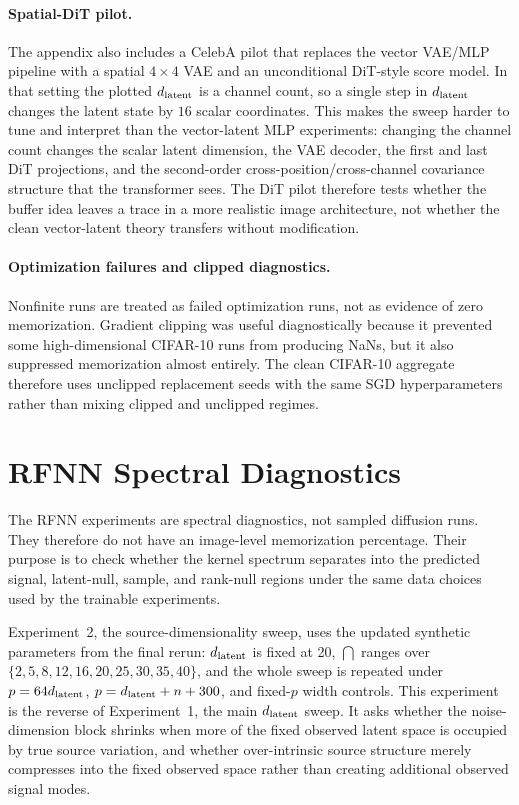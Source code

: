 \paragraph{Spatial-DiT pilot.}
The appendix also includes a CelebA pilot that replaces the vector VAE/MLP
pipeline with a spatial $4\times4$ VAE and an unconditional DiT-style score
model. In that setting the plotted $d_{\mathrm{latent}}$ is a channel count, so a single
step in $d_{\mathrm{latent}}$ changes the latent state by $16$ scalar coordinates. This
makes the sweep harder to tune and interpret than the vector-latent MLP
experiments: changing the channel count changes the scalar latent dimension,
the VAE decoder, the first and last DiT projections, and the second-order
cross-position/cross-channel covariance structure that the transformer sees.
The DiT pilot therefore tests whether the buffer idea leaves a trace in a
more realistic image architecture, not whether the clean vector-latent theory
transfers without modification.

\paragraph{Optimization failures and clipped diagnostics.}
Nonfinite runs are treated as failed optimization runs, not as evidence of zero
memorization. Gradient clipping was useful diagnostically because it prevented
some high-dimensional CIFAR-10 runs from producing NaNs, but it also suppressed
memorization almost entirely. The clean CIFAR-10 aggregate therefore uses
unclipped replacement seeds with the same SGD hyperparameters rather than
mixing clipped and unclipped regimes.

\FloatBarrier

\section{RFNN Spectral Diagnostics}
\label{app:rfnn-clean}
\label{app:appendix-figures}

The RFNN experiments are spectral diagnostics, not sampled diffusion runs. They
therefore do not have an image-level memorization percentage. Their purpose is
to check whether the kernel spectrum separates into the predicted signal,
latent-null, sample, and rank-null regions under the same data choices used by
the trainable experiments.

Experiment~2, the source-dimensionality sweep, uses the updated synthetic
parameters from the final rerun: $d_{\mathrm{latent}}$ is fixed at 20, $\dint$ ranges over
$\{2,5,8,12,16,20,25,30,35,40\}$, and the whole sweep is repeated under
$p=64d_{\mathrm{latent}}$, $p=d_{\mathrm{latent}}+n+300$, and fixed-$p$ width controls. This experiment is
the reverse of Experiment~1, the main $d_{\mathrm{latent}}$ sweep. It asks whether the noise-dimension block
shrinks when more of the fixed observed latent space is occupied by true source
variation, and whether over-intrinsic source structure merely compresses into
the fixed observed space rather than creating additional observed signal modes.


